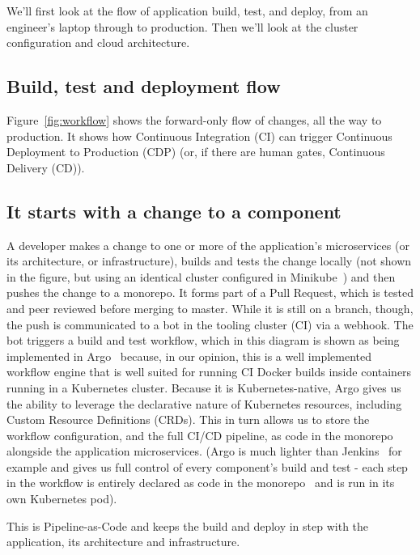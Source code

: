 \documentclass[reprint,amsmath,amssymb,aps]{revtex4-1}
\begin{document}
We'll first look at the flow of application build, test, and deploy, from an engineer's laptop through to production. Then we'll look at the cluster configuration and cloud architecture.

\subsection{\label{sec:buildflow}Build, test and deployment flow}

Figure~\ref{fig:workflow} shows the forward-only flow of changes, all the way to production. It shows how Continuous Integration (CI) can trigger Continuous Deployment to Production (CDP) (or, if there are human gates, Continuous Delivery (CD)).

\subsection{\label{sec:initialchange}It starts with a change to a component}

A developer makes a change to one or more of the application's microservices (or its architecture, or infrastructure), builds and tests the change locally (not shown in the figure, but using an identical cluster configured in Minikube~\cite{RunningK70:online}) and then pushes the change to a monorepo. It forms part of a Pull Request, which is tested and peer reviewed before merging to master. While it is still on a branch, though, the push is communicated to a bot in the tooling cluster (CI) via a webhook. The bot triggers a build and test workflow, which in this diagram is shown as being implemented in Argo~\cite{argoproj96:online} because, in our opinion, this is a well implemented workflow engine that is well suited for running CI Docker builds inside containers running in a Kubernetes cluster. Because it is Kubernetes-native, Argo gives us the ability to leverage the declarative nature of Kubernetes resources, including Custom Resource Definitions (CRDs). This in turn allows us to store the workflow configuration, and the full CI/CD pipeline, as code in the monorepo alongside the application microservices. (Argo is much lighter than Jenkins~\cite{Jenkins9:online} for example and gives us full control of every component's build and test - each step in the workflow is entirely declared as code in the monorepo~\cite{Monorepo54:online} and is run in its own Kubernetes pod).

This is Pipeline-as-Code and keeps the build and deploy in step with the application, its architecture and infrastructure.
\end{document}
